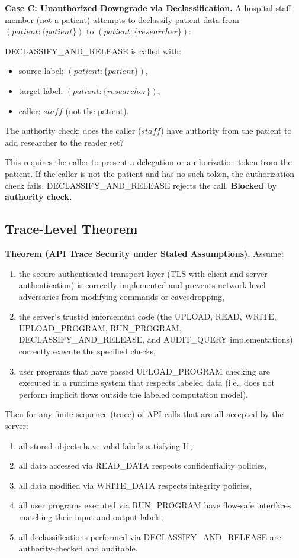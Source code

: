\textbf{Case C: Unauthorized Downgrade via Declassification.} A hospital staff member (not a patient) attempts to declassify patient data from $(patient:\{patient\})$ to $(patient:\{researcher\})$:

DECLASSIFY\_AND\_RELEASE is called with:
\begin{itemize}
    \item source label: $(patient:\{patient\})$,
    \item target label: $(patient:\{researcher\})$,
    \item caller: $staff$ (not the patient).
\end{itemize}

The authority check: does the caller ($staff$) have authority from the patient to add researcher to the reader set?

This requires the caller to present a delegation or authorization token from the patient. If the caller is not the patient and has no such token, the authorization check fails. DECLASSIFY\_AND\_RELEASE rejects the call. \textbf{Blocked by authority check.}

\subsection{Trace-Level Theorem}

\textbf{Theorem (API Trace Security under Stated Assumptions).}
Assume:
\begin{enumerate}
    \item the secure authenticated transport layer (TLS with client and server authentication) is correctly implemented and prevents network-level adversaries from modifying commands or eavesdropping,
    \item the server's trusted enforcement code (the UPLOAD, READ, WRITE, UPLOAD\_PROGRAM, RUN\_PROGRAM, DECLASSIFY\_AND\_RELEASE, and AUDIT\_QUERY implementations) correctly execute the specified checks,
    \item user programs that have passed UPLOAD\_PROGRAM checking are executed in a runtime system that respects labeled data (i.e., does not perform implicit flows outside the labeled computation model).
\end{enumerate}

Then for any finite sequence (trace) of API calls that are all accepted by the server:
\begin{enumerate}
    \item all stored objects have valid labels satisfying I1,
    \item all data accessed via READ\_DATA respects confidentiality policies,
    \item all data modified via WRITE\_DATA respects integrity policies,
    \item all user programs executed via RUN\_PROGRAM have flow-safe interfaces matching their input and output labels,
    \item all declassifications performed via DECLASSIFY\_AND\_RELEASE are authority-checked and auditable,
\end{enumerate}

